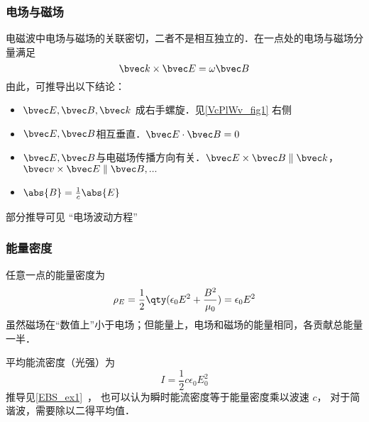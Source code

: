 \subsubsection{电场与磁场}
电磁波中电场与磁场的关联密切，二者不是相互独立的．在一点处的电场与磁场分量满足
\begin{equation}
\bvec k \times \bvec E = \omega \bvec B
\end{equation}
由此，可推导出以下结论：
\begin{itemize}
\item $\bvec E, \bvec B, \bvec k$ 成右手螺旋．见\autoref{VcPlWv_fig1} 右侧
\item $\bvec E, \bvec B$相互垂直．$\bvec E \cdot \bvec B = 0$
\item $\bvec E, \bvec B$与电磁场传播方向有关．$\bvec E \times \bvec B \parallel \bvec k$，$\bvec v \times \bvec E \parallel \bvec B, ...$
\item $\abs{B}=\frac{1}{c}\abs{E}$
\end{itemize}

部分推导可见 “电场波动方程”

\subsubsection{能量密度}
任意一点的能量密度为
\begin{equation}\label{VcPlWv_eq2}
\rho_E = \frac{1}{2}\qty(\epsilon_0 E^2 + \frac{B^2}{\mu_0}) = \epsilon_0 E^2
\end{equation}
虽然磁场在“数值上”小于电场；但能量上，电场和磁场的能量相同，各贡献总能量一半． 

平均能流密度（光强）为
\begin{equation}
I = \frac12 c\epsilon_0 E_0^2
\end{equation}
推导见\autoref{EBS_ex1}~， 也可以认为瞬时能流密度等于能量密度乘以波速 $c$， 对于简谐波，需要除以二得平均值．


